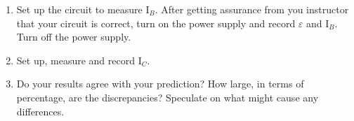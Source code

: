 \begin{enumerate}
\item Set up the circuit to measure I\( _{B} \). After getting assurance
from you instructor that your circuit is correct, turn on the power
supply and record \( \varepsilon  \) and I\( _{B} \). Turn off the
power supply.
\answerspace{15mm}

\item Set up, measure and record I\( _{C} \).\vspace{15mm}

\item Do your results agree with your prediction? How large, in terms of
percentage, are the discrepancies? Speculate on what might cause any
differences.
\answerspace{15mm}
\end{enumerate}

